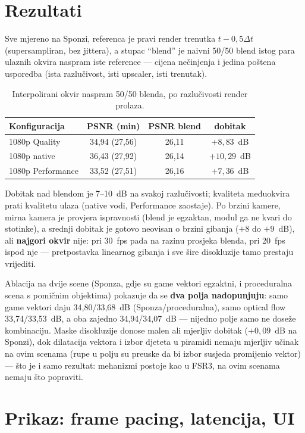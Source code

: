 \documentclass{mathos}
\begin{document}
\section{Rezultati}

Sve mjereno na Sponzi, referenca je pravi render trenutka $t-0,5\Delta t$
(supersampliran, bez jittera), a stupac ``blend'' je naivni 50/50 blend
istog para ulaznih okvira naspram iste reference — cijena nečinjenja i
jedina poštena usporedba (ista razlučivost, isti upscaler, isti trenutak).

\begin{table}[hbtp]
\centering
\begin{tabular}{|l|c|c|c|}\hline
Konfiguracija & PSNR (min) & PSNR blend & dobitak \\\hline
1080p Quality & 34,94 (27,56) & 26,11 & $+8,83$~dB \\\hline
1080p native & 36,43 (27,92) & 26,14 & $+10,29$~dB \\\hline
1080p Performance & 33,52 (27,51) & 26,16 & $+7,36$~dB \\\hline
\end{tabular}
\caption{Interpolirani okvir naspram 50/50 blenda, po razlučivosti render prolaza.}
\label{table_m7_razlucivost}
\end{table}

Dobitak nad blendom je 7--10~dB na svakoj razlučivosti; kvaliteta međuokvira
prati kvalitetu ulaza (native vodi, Performance zaostaje). Po brzini kamere,
mirna kamera je provjera ispravnosti (blend je egzaktan, modul ga ne kvari
do stotinke), a srednji dobitak je gotovo neovisan o brzini gibanja
($+8$ do $+9$~dB), ali \textbf{najgori okvir} nije: pri 30~fps pada na razinu
prosjeka blenda, pri 20~fps ispod nje — pretpostavka linearnog gibanja i sve
šire disokluzije tamo prestaju vrijediti.

Ablacija na dvije scene (Sponza, gdje su game vektori egzaktni, i procedu\-ralna
scena s pomičnim objektima) pokazuje da se \textbf{dva polja nadopunjuju}:
samo game vektori daju 34,80/33,68~dB (Sponza/proceduralna), samo optical
flow 33,74/33,53~dB, a oba zajedno 34,94/34,07~dB — nijedno polje samo ne
doseže kombinaciju. Maske disokluzije donose malen ali mjerljiv dobitak
($+0,09$~dB na Sponzi), dok dilatacija vektora i izbor djeteta u piramidi
nemaju mjerljiv učinak na ovim scenama (rupe u polju su preuske da bi izbor
susjeda promijenio vektor) — što je i samo rezultat: mehanizmi postoje kao u
FSR3, na ovim scenama nemaju što popraviti.

\section{Prikaz: frame pacing, latencija, UI}
\end{document}
